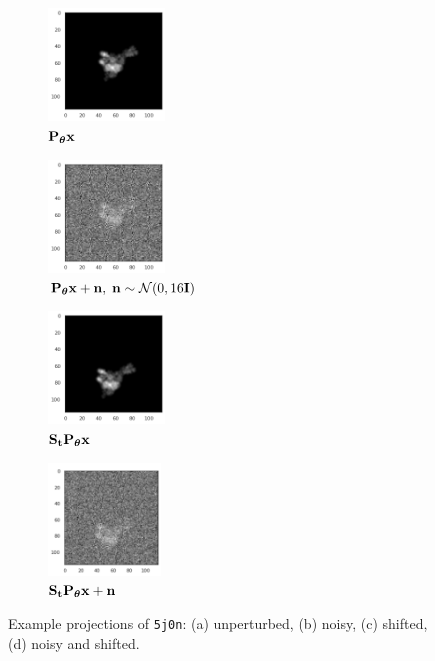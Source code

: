 \begin{figure}[ht!]
    \centering
    \begin{subfigure}[b]{0.24\textwidth}
        \centering
        \includegraphics[height=3cm]{figures/5j0n_noise0}
        \caption{$\mathbf{P}_{{\boldsymbol{\theta}}} \mathbf{x}$}
    \end{subfigure}
    \hfill
    \begin{subfigure}[b]{0.24\linewidth}
        \centering
        \includegraphics[height=3cm]{figures/5j0n_noise16}
        \caption{$\mathbf{P}_{{\boldsymbol{\theta}}} \mathbf{x} + \mathbf{n}, \; \mathbf{n} \sim \mathcal{N}(0, 16\mathbf{I})$}
    \end{subfigure}
    \hfill
    \begin{subfigure}[b]{0.24\linewidth}
        \centering
        \includegraphics[height=3cm]{figures/5j0n_translated}
        \caption{$\mathbf{S}_{\mathbf{t}} \mathbf{P}_{{\boldsymbol{\theta}}} \mathbf{x}$}
    \end{subfigure}
    \hfill
    \begin{subfigure}[b]{0.24\linewidth}
        \centering
        \includegraphics[height=3cm]{figures/5j0n_noise16_translated}
        \caption{$\mathbf{S}_{\mathbf{t}} \mathbf{P}_{{\boldsymbol{\theta}}} \mathbf{x} + \mathbf{n}$}
    \end{subfigure}
    \caption{%
        Example projections of \texttt{5j0n}: (a) unperturbed, (b) noisy, (c) shifted, (d) noisy and shifted.
    }\label{fig:different-projections}
\end{figure}

